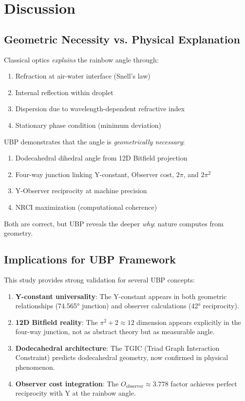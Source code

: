 \documentclass[11pt,a4paper]{article}
\begin{document}
\section{Discussion}

\subsection{Geometric Necessity vs. Physical Explanation}

Classical optics \textit{explains} the rainbow angle through:
\begin{enumerate}
    \item Refraction at air-water interface (Snell's law)
    \item Internal reflection within droplet
    \item Dispersion due to wavelength-dependent refractive index
    \item Stationary phase condition (minimum deviation)
\end{enumerate}

UBP demonstrates that the angle is \textit{geometrically necessary}:
\begin{enumerate}
    \item Dodecahedral dihedral angle from 12D Bitfield projection
    \item Four-way junction linking Y-constant, Observer cost, $2\pi$, and $2\pi^2$
    \item Y-Observer reciprocity at machine precision
    \item NRCI maximization (computational coherence)
\end{enumerate}

Both are correct, but UBP reveals the deeper \textit{why}: nature computes from geometry.

\subsection{Implications for UBP Framework}

This study provides strong validation for several UBP concepts:

\begin{enumerate}
    \item \textbf{Y-constant universality}: The Y-constant appears in both geometric relationships (74.565° junction) and observer calculations (42° reciprocity).
    
    \item \textbf{12D Bitfield reality}: The $\pi^2+2 \approx 12$ dimension appears explicitly in the four-way junction, not as abstract theory but as measurable angle.
    
    \item \textbf{Dodecahedral architecture}: The TGIC (Triad Graph Interaction Constraint) predicts dodecahedral geometry, now confirmed in physical phenomenon.
    
    \item \textbf{Observer cost integration}: The $O_{\text{observer}} \approx 3.778$ factor achieves perfect reciprocity with Y at the rainbow angle.
\end{enumerate}
\end{document}
